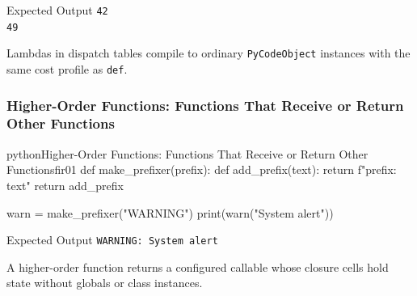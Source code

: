 \begin{iobox}{Expected Output}
\texttt{42} \\
\texttt{49} \\
\end{iobox}




Lambdas in dispatch tables compile to ordinary \texttt{PyCodeObject} instances with the same cost profile as \texttt{def}.

\subsubsection{Higher-Order Functions: Functions That Receive or Return Other Functions}

\begin{codebox}[]{python}{Higher-Order Functions: Functions That Receive or Return Other Functions}{fir01}
def make_prefixer(prefix):
    def add_prefix(text):
        return f"{prefix}: {text}"
    return add_prefix

warn = make_prefixer("WARNING")
print(warn("System alert"))
\end{codebox}


\begin{iobox}{Expected Output}
\texttt{WARNING: System alert} \\
\end{iobox}




A higher-order function returns a configured callable whose closure cells hold state without globals or class instances.
